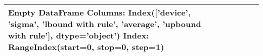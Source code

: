 \begin{tabular}{lrrrrr}
\toprule
Empty DataFrame
Columns: Index(['device', 'sigma', 'lbound with rule', 'average', 'upbound with rule'], dtype='object')
Index: RangeIndex(start=0, stop=0, step=1) \\
\bottomrule
\end{tabular}

